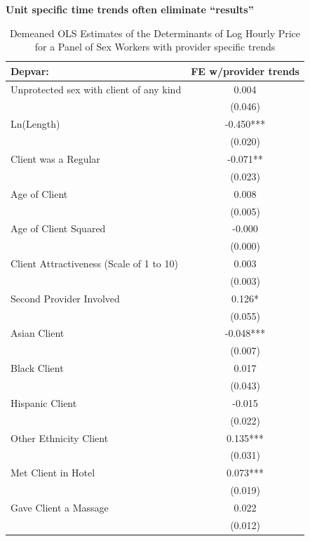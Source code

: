 \documentclass{beamer}
\begin{document}
\begin{frame}[plain]
	\begin{center}
	\textbf{Unit specific time trends often eliminate ``results''}
	\end{center}
	
\begin{table}[htbp]\centering
\tiny
\caption{Demeaned OLS Estimates of the Determinants of Log Hourly Price for a Panel of Sex Workers with provider specific trends}
\label{sasp}
\begin{center}
\begin{threeparttable}
\begin{tabular}{l*{1}{c}}
\toprule
\multicolumn{1}{l}{\textbf{Depvar:}}&
\multicolumn{1}{c}{\textbf{FE w/provider trends}}\\
\midrule
Unprotected sex with client of any kind&       0.004   \\
                    &     (0.046)   \\
Ln(Length)          &      -0.450***\\
                    &     (0.020)   \\
Client was a Regular&      -0.071** \\
                    &     (0.023)   \\
Age of Client       &       0.008   \\
                    &     (0.005)   \\
Age of Client Squared&      -0.000   \\
                    &     (0.000)   \\
Client Attractiveness (Scale of 1 to 10)&       0.003   \\
                    &     (0.003)   \\
Second Provider Involved&       0.126*  \\
                    &     (0.055)   \\
Asian Client        &      -0.048***\\
                    &     (0.007)   \\
Black Client        &       0.017   \\
                    &     (0.043)   \\
Hispanic Client     &      -0.015   \\
                    &     (0.022)   \\
Other Ethnicity Client&       0.135***\\
                    &     (0.031)   \\
Met Client in Hotel &       0.073***\\
                    &     (0.019)   \\
Gave Client a Massage&       0.022   \\
                    &     (0.012)   \\
\end{tabular}
\end{threeparttable}
\end{center}
\end{table}

	
 	
\end{frame}
\end{document}
